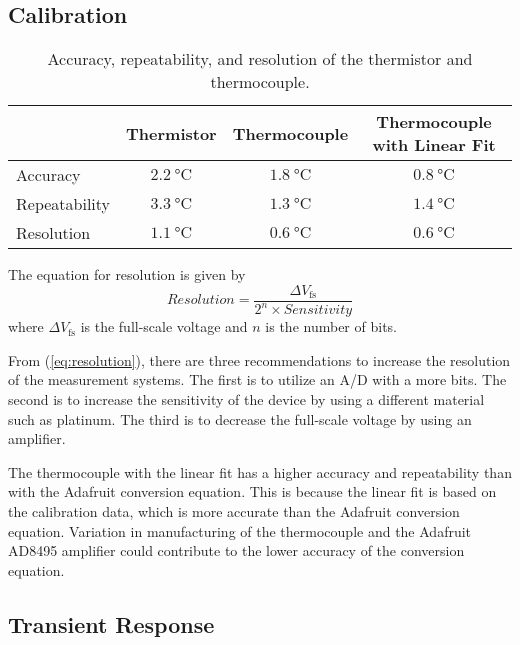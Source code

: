 \subsection{Calibration}
\begin{table}[h]
    \centering
    \caption{Accuracy, repeatability, and resolution of the thermistor and thermocouple.}
    \label{tab:accuracy}
    \begin{tabular}{lccc}
        \toprule
        & Thermistor & Thermocouple & Thermocouple with Linear Fit \\
        \midrule
        Accuracy & $\qty{2.2}{\celsius}$ & $\qty{1.8}{\celsius}$ & $\qty{0.8}{\celsius}$ \\
        Repeatability & $\qty{3.3}{\celsius}$ & $\qty{1.3}{\celsius}$ & $\qty{1.4}{\celsius}$ \\
        Resolution & $\qty{1.1}{\celsius}$ & $\qty{0.6}{\celsius}$ & $\qty{0.6}{\celsius}$ \\
        \bottomrule
    \end{tabular}
\end{table}
\noindent The equation for resolution is given by
\begin{equation}
    Resolution = \frac{\Delta V_{\text{fs}}}{2^{n}\times Sensitivity} \label{eq:resolution}
\end{equation}
where $\Delta V_{\text{fs}}$ is the full-scale voltage and $n$ is the number of bits.

From (\ref{eq:resolution}), there are three recommendations to increase the resolution of the measurement systems. The first is to utilize an A/D 
with a more bits. The second is to increase the sensitivity of the device by using a different material such as platinum. The third is to 
decrease the full-scale voltage by using an amplifier.

The thermocouple with the linear fit has a higher accuracy and repeatability than with the Adafruit conversion equation. This is because the
linear fit is based on the calibration data, which is more accurate than the Adafruit conversion equation. Variation in manufacturing of the
thermocouple and the Adafruit AD8495 amplifier could contribute to the lower accuracy of the conversion equation.

\subsection{Transient Response}

